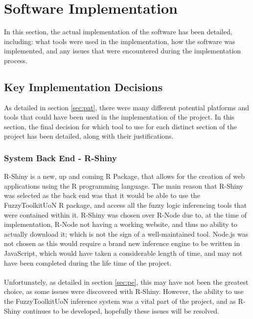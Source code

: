 \section{Software Implementation}
In this section, the actual implementation of the software has been detailed, including: what tools were used in the implementation, how the software was implemented, and any issues that were encountered during the implementation process.

\subsection{Key Implementation Decisions}
\label{sec:kid}
As detailed in section \ref{sec:pat}, there were many different potential platforms and tools that could have been used in the implementation of the project. In this section, the final decision for which tool to use for each distinct section of the project has been detailed, along with their justifications.

\tocless\subsubsection{System Back End - R-Shiny}
R-Shiny is a new, up and coming R Package, that allows for the creation of web applications using the R programming language. The main reason that R-Shiny was selected as the back end was that it would be able to use the FuzzyToolkitUoN R package, and access all the fuzzy logic inferencing tools that were contained within it. R-Shiny was chosen over R-Node due to, at the time of implementation, R-Node not having a working website, and thus no ability to actually download it; which is not the sign of a well-maintained tool. Node.js was not chosen as this would require a brand new inference engine to be written in JavaScript, which would have taken a considerable length of time, and may not have been completed during the life time of the project.\ \\
\ \\
Unfortunately, as detailed in section \ref{sec:pe}, this may have not been the greatest choice, as some issues were discovered with R-Shiny. However, the ability to use the FuzzyToolkitUoN inference system was a vital part of the project, and as R-Shiny continues to be developed, hopefully these issues will be resolved.


